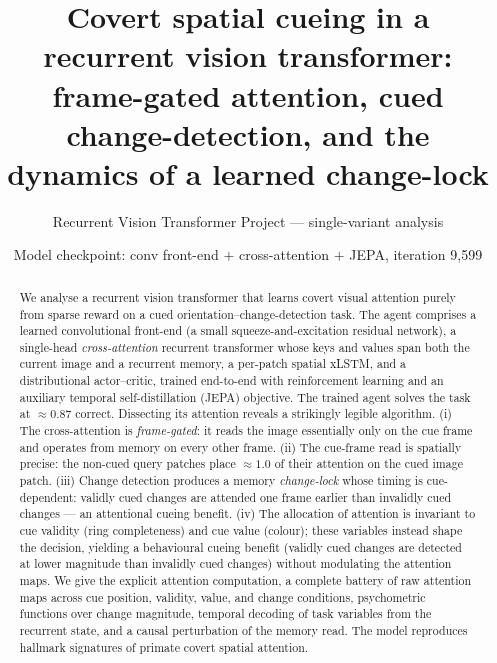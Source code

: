 \documentclass[11pt]{article}
\title{\textbf{Covert spatial cueing in a recurrent vision transformer:\\
frame-gated attention, cued change-detection, and the dynamics of a learned change-lock}}
\author{Recurrent Vision Transformer Project --- single-variant analysis}
\date{Model checkpoint: conv front-end $+$ cross-attention $+$ JEPA, iteration 9{,}599}
\begin{document}
\maketitle

\begin{abstract}
\noindent We analyse a recurrent vision transformer that learns covert visual attention purely from
sparse reward on a cued orientation--change-detection task. The agent comprises a learned convolutional
front-end (a small squeeze-and-excitation residual network), a single-head \emph{cross-attention}
recurrent transformer whose keys and values span both the current image and a recurrent memory, a
per-patch spatial xLSTM, and a distributional actor--critic, trained end-to-end with reinforcement
learning and an auxiliary temporal self-distillation (JEPA) objective. The trained agent solves the
task at $\approx\!0.87$ correct. Dissecting its attention reveals a strikingly legible algorithm. (i)
The cross-attention is \emph{frame-gated}: it reads the image essentially only on the cue frame and
operates from memory on every other frame. (ii) The cue-frame read is spatially precise: the
non-cued query patches place $\approx\!1.0$ of their attention on the cued image patch. (iii) Change
detection produces a memory \emph{change-lock} whose timing is cue-dependent: validly cued changes are
attended one frame earlier than invalidly cued changes --- an attentional cueing benefit. (iv) The
allocation of attention is invariant to cue validity (ring completeness) and cue value (colour);
these variables instead shape the decision, yielding a behavioural cueing benefit (validly cued changes
are detected at lower magnitude than invalidly cued changes) without modulating the attention maps.
We give the explicit attention computation, a complete battery of raw attention maps across cue
position, validity, value, and change conditions, psychometric functions over change magnitude,
temporal decoding of task variables from the recurrent state, and a causal perturbation of the memory
read. The model reproduces hallmark signatures of primate covert spatial attention.
\end{abstract}
\end{document}
